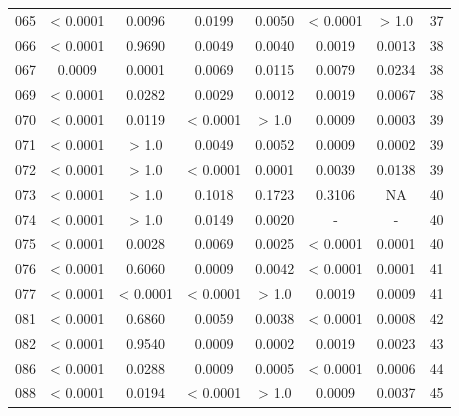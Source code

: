 {\begin{longtable}{cccccccc}
065 & {\color{red} < 0.0001} & {\color{red}0.0096} & {\color{red}0.0199} & {\color{red}0.0050} & {\color{red} < 0.0001} & > 1.0 & 37 \\
066 & {\color{red} < 0.0001} & 0.9690 & {\color{red}0.0049} & {\color{red}0.0040} & {\color{red}0.0019} & {\color{red}0.0013} & 38 \\
067 & {\color{red}0.0009} & {\color{red}0.0001} & {\color{red}0.0069} & {\color{red}0.0115} & {\color{red}0.0079} & {\color{red}0.0234} & 38 \\
069 & {\color{red} < 0.0001} & {\color{red}0.0282} & {\color{red}0.0029} & {\color{red}0.0012} & {\color{red}0.0019} & {\color{red}0.0067} & 38 \\
070 & {\color{red} < 0.0001} & {\color{red}0.0119} & {\color{red} < 0.0001} & > 1.0 & {\color{red}0.0009} & {\color{red}0.0003} & 39 \\
071 & {\color{red} < 0.0001} & > 1.0 & {\color{red}0.0049} & {\color{red}0.0052} & {\color{red}0.0009} & {\color{red}0.0002} & 39 \\
072 & {\color{red} < 0.0001} & > 1.0 & {\color{red} < 0.0001} & {\color{red}0.0001} & {\color{red}0.0039} & {\color{red}0.0138} & 39 \\
073 & {\color{red} < 0.0001} & > 1.0 & 0.1018 & 0.1723 & 0.3106 & NA & 40 \\
074 & {\color{red} < 0.0001} & > 1.0 & {\color{red}0.0149} & {\color{red}0.0020} & - & - &  40 \\
075 & {\color{red} < 0.0001} & {\color{red}0.0028} & {\color{red}0.0069} & {\color{red}0.0025} & {\color{red} < 0.0001} & {\color{red}0.0001} & 40 \\
076 & {\color{red} < 0.0001} & 0.6060 & {\color{red}0.0009} & {\color{red}0.0042} & {\color{red} < 0.0001} & {\color{red}0.0001} & 41 \\
077 & {\color{red} < 0.0001} & {\color{red} < 0.0001} & {\color{red} < 0.0001} & > 1.0 & {\color{red}0.0019} & {\color{red}0.0009} & 41 \\
081 & {\color{red} < 0.0001} & 0.6860 & {\color{red}0.0059} & {\color{red}0.0038} & {\color{red} < 0.0001} & {\color{red}0.0008} & 42 \\
082 & {\color{red} < 0.0001} & 0.9540 & {\color{red}0.0009} & {\color{red}0.0002} & {\color{red}0.0019} & {\color{red}0.0023} & 43 \\
086 & {\color{red} < 0.0001} & {\color{red}0.0288} & {\color{red}0.0009} & {\color{red}0.0005} & {\color{red} < 0.0001} & {\color{red}0.0006} & 44 \\
088 & {\color{red} < 0.0001} & {\color{red}0.0194} & {\color{red} < 0.0001} & > 1.0 & {\color{red}0.0009} & {\color{red}0.0037} & 45 \\

\end{longtable}}
